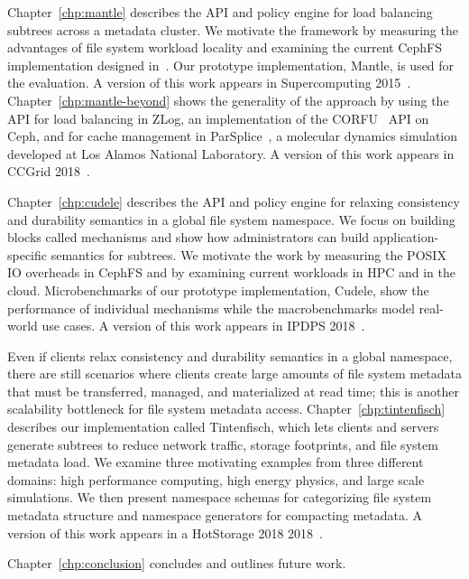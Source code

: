 Chapter~\ref{chp:mantle} describes the API and policy engine for load balancing
subtrees across a metadata cluster. We motivate the framework by measuring the
advantages of file system workload locality and examining the current CephFS
implementation designed in~\cite{weil:osdi2006-ceph, weil:sc2004-dyn-metadata}.
Our prototype implementation, Mantle, is used for the evaluation. A version of
this work appears in Supercomputing 2015~\cite{sevilla:sc15-mantle}.
Chapter~\ref{chp:mantle-beyond} shows the generality of the approach by using
the API for load balancing in ZLog, an implementation of the
CORFU~\cite{balakrishnan_corfu_2012} API on Ceph, and for cache management in
ParSplice~\cite{perez:jctc20150parsplice}, a molecular dynamics simulation
developed at Los Alamos National Laboratory. A version of this work appears in
CCGrid 2018~\cite{sevilla:ccgrid18-parsplice}.

Chapter~\ref{chp:cudele} describes the API and policy engine for relaxing
consistency and durability semantics in a global file system namespace. We
focus on building blocks called mechanisms and show how administrators can
build application-specific semantics for subtrees.  We motivate the work by
measuring the POSIX IO overheads in CephFS and by examining current workloads
in HPC and in the cloud. Microbenchmarks of our prototype implementation,
Cudele, show the performance of individual mechanisms while the macrobenchmarks
model real-world use cases. A version of this work appears in IPDPS
2018~\cite{sevilla:ipdps18-cudele}.

Even if clients relax consistency and durability semantics in a global
namespace, there are still scenarios where clients create large amounts of file
system metadata that must be transferred, managed, and materialized at read
time; this is another scalability bottleneck for file system metadata access.
Chapter~\ref{chp:tintenfisch} describes our implementation called Tintenfisch,
which lets clients and servers generate subtrees to reduce network traffic,
storage footprints, and file system metadata load. We examine three motivating
examples from three different domains: high performance computing, high energy
physics, and large scale simulations. We then present namespace schemas for
categorizing file system metadata structure and namespace generators for
compacting metadata. A version of this work appears in a HotStorage 2018
2018~\cite{sevilla:hotstorage18-tintenfisch}.

Chapter~\ref{chp:conclusion} concludes and outlines future work.


